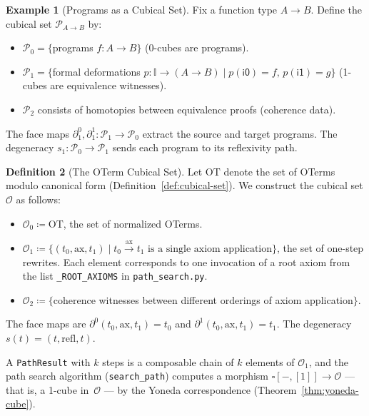 \documentclass[11pt,a4paper]{report}
\theoremstyle{definition}
\newtheorem{definition}{Definition}[chapter]
\newtheorem{example}[definition]{Example}
\theoremstyle{plain}
\newcommand{\interval}{\mathbb{I}}
\begin{document}
\begin{example}[Programs as a Cubical Set]
\label{ex:programs-cubical}
Fix a function type $A \to B$.  Define the cubical set $\mathcal{P}_{A \to B}$ by:
\begin{itemize}
  \item $\mathcal{P}_0 = \{$programs $f : A \to B\}$ (0-cubes are programs).
  \item $\mathcal{P}_1 = \{$formal deformations $p : \interval \to (A \to B)
    \mid p(\mathsf{i0}) = f,\, p(\mathsf{i1}) = g\}$ (1-cubes are equivalence
    witnesses).
  \item $\mathcal{P}_2$ consists of homotopies between equivalence proofs
    (coherence data).
\end{itemize}
The face maps $\partial_1^0, \partial_1^1 : \mathcal{P}_1 \to \mathcal{P}_0$
extract the source and target programs.  The degeneracy $s_1 : \mathcal{P}_0
\to \mathcal{P}_1$ sends each program to its reflexivity path.
\end{example}

\begin{definition}[The OTerm Cubical Set]
\label{def:oterm-cubical-set}
Let $\mathrm{OT}$ denote the set of OTerms modulo canonical form
(Definition~\ref{def:cubical-set}).  We construct the cubical set
$\mathcal{O}$ as follows:
\begin{itemize}
  \item $\mathcal{O}_0 \coloneqq \mathrm{OT}$, the set of normalized OTerms.
  \item $\mathcal{O}_1 \coloneqq \{(t_0, \mathrm{ax}, t_1) \mid t_0
    \xrightarrow{\mathrm{ax}} t_1 \text{ is a single axiom application}\}$,
    the set of one-step rewrites.  Each element corresponds to one
    invocation of a root axiom from the list
    \texttt{\_ROOT\_AXIOMS} in \texttt{path\_search.py}.
  \item $\mathcal{O}_2 \coloneqq \{$coherence witnesses between
    different orderings of axiom application$\}$.
\end{itemize}
The face maps are $\partial^0(t_0, \mathrm{ax}, t_1) = t_0$ and
$\partial^1(t_0, \mathrm{ax}, t_1) = t_1$.
The degeneracy $s(t) = (t, \mathrm{refl}, t)$.

A \texttt{PathResult} with $k$ steps is a composable chain of $k$
elements of $\mathcal{O}_1$, and the path search algorithm
(\texttt{search\_path}) computes a morphism
$\square[-, [1]] \to \mathcal{O}$ --- that is, a 1-cube in~$\mathcal{O}$
--- by the Yoneda correspondence (Theorem~\ref{thm:yoneda-cube}).
\end{definition}
\end{document}
